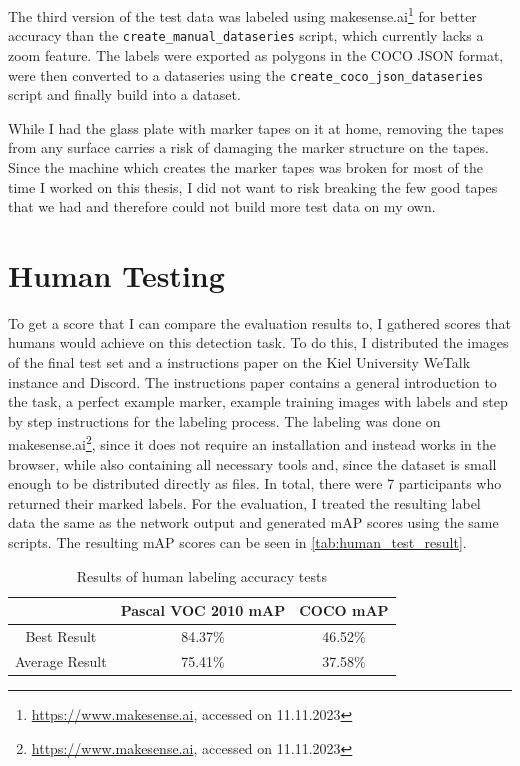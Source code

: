 \documentclass[10pt]{book}
\begin{document}
The third version of the test data was labeled using makesense.ai\footnote{\url{https://www.makesense.ai}, accessed on 11.11.2023} for better accuracy than the \texttt{create\_manual\_dataseries} script, which currently lacks a zoom feature. The labels were exported as polygons in the \ac{COCO} \ac{JSON} format, were then converted to a dataseries using the \texttt{create\_coco\_json\_dataseries} script and finally build into a dataset.

While I had the glass plate with marker tapes on it at home, removing the tapes from any surface carries a risk of damaging the marker structure on the tapes. Since the machine which creates the marker tapes was broken for most of the time I worked on this thesis, I did not want to risk breaking the few good tapes that we had and therefore could not build more test data on my own.

\section{Human Testing}

To get a score that I can compare the evaluation results to, I gathered scores that humans would achieve on this detection task. To do this, I distributed the images of the final test set and a instructions paper on the Kiel University WeTalk instance and Discord. The instructions paper contains a general introduction to the task, a perfect example marker, example training images with labels and step by step instructions for the labeling process. The labeling was done on makesense.ai\footnote{\url{https://www.makesense.ai}, accessed on 11.11.2023}, since it does not require an installation and instead works in the browser, while also containing all necessary tools and, since the dataset is small enough to be distributed directly as files. In total, there were 7 participants who returned their marked labels. For the evaluation, I treated the resulting label data the same as the network output and generated \ac{mAP} scores using the same scripts. The resulting \ac{mAP} scores can be seen in \autoref{tab:human_test_result}.

\begin{table}
  \begin{tabular}{ c c c }
   & Pascal VOC 2010 \ac{mAP} & \ac{COCO} \ac{mAP} \\ 
   \hline
   Best Result & 84.37\% & 46.52\% \\
   Average Result & 75.41\% & 37.58\% \\
   \hline
  \end{tabular}
  \caption{\label{tab:human_test_result}Results of human labeling accuracy tests}
\end{table}
\end{document}
